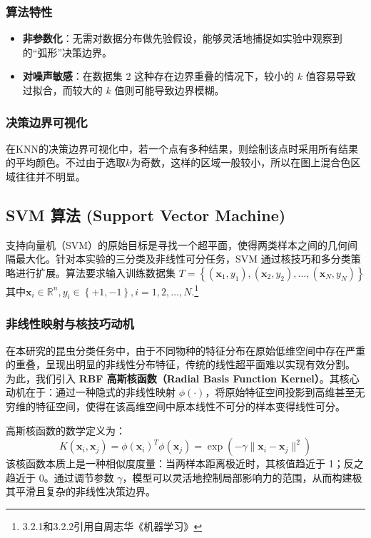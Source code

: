 \subsubsection{算法特性}

\begin{itemize}
	\item \textbf{非参数化}：无需对数据分布做先验假设，能够灵活地捕捉如实验中观察到的“弧形”决策边界。
	
	\item \textbf{对噪声敏感}：在数据集 2 这种存在边界重叠的情况下，较小的 $k$ 值容易导致过拟合，而较大的 $k$ 值则可能导致边界模糊。
\end{itemize}

\subsubsection{决策边界可视化}
在KNN的决策边界可视化中，若一个点有多种结果，则绘制该点时采用所有结果的平均颜色。不过由于选取$k$为奇数，这样的区域一般较小，所以在图上混合色区域往往并不明显。

\subsection{SVM 算法 (Support Vector Machine)}

支持向量机（SVM）的原始目标是寻找一个超平面，使得两类样本之间的几何间隔最大化。针对本实验的三分类及非线性可分任务，SVM 通过核技巧和多分类策略进行扩展。算法要求输入训练数据集  $T=\left\{ \left( \boldsymbol{x}_1,y_1 \right) ,\left( \boldsymbol{x}_2,y_2 \right) ,...,\left( \boldsymbol{x}_N,y_N \right) \right\}$ 其中$\boldsymbol{x}_i\in \mathbb{R}^n , y_i\in \left\{ +1,-1 \right\} ,i=1,2,...,N.$\footnote{3.2.1和3.2.2引用自周志华《机器学习》}

\subsubsection{非线性映射与核技巧动机}
在本研究的昆虫分类任务中，由于不同物种的特征分布在原始低维空间中存在严重的重叠，呈现出明显的非线性分布特征，传统的线性超平面难以实现有效分割。
为此，我们引入 \textbf{RBF 高斯核函数（Radial Basis Function Kernel）}。其核心动机在于：通过一种隐式的非线性映射 $\phi(\cdot)$，将原始特征空间投影到高维甚至无穷维的特征空间，使得在该高维空间中原本线性不可分的样本变得线性可分。

高斯核函数的数学定义为：
$$ K(\mathbf{x}_i, \mathbf{x}_j) = \phi(\mathbf{x}_i)^T \phi(\mathbf{x}_j) = \exp\left(-\gamma \|\mathbf{x}_i - \mathbf{x}_j\|^2\right) $$
该核函数本质上是一种相似度度量：当两样本距离极近时，其核值趋近于 1；反之趋近于 0。通过调节参数 $\gamma$，模型可以灵活地控制局部影响力的范围，从而构建极其平滑且复杂的非线性决策边界。

